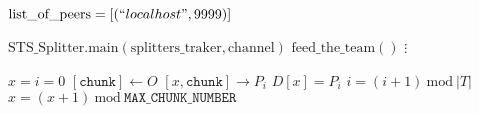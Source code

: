 \documentclass{article}
\begin{document}
\pagestyle{empty}

\newcommand{\send}{\Rightarrow}
\newcommand{\sendto}{\rightarrow}
\newcommand{\recv}{\Leftarrow}
\algrenewcommand\textproc{\textrm}

\begin{algorithmic}

  \algrenewcommand{}

  \State $\text{list\_of\_peers}=[(``localhost", 9999)]$
  
  \State $\text{STS\_Splitter}.\text{main}(\text{splitters\_traker},\text{channel})$
  \State $\text{feed\_the\_team}()$
  \State $\vdots$
  \EndFunction

  \algrenewcommand{}
  \State $x=i=0$
  \State $[\mathtt{chunk}] \gets O$
  \State $[x,\mathtt{chunk}] \sendto P_i$
  \State $D[x]=P_i$
  \State $i=(i+1)~\text{mod}~|T|$
  \State $x=(x+1)~\text{mod}~\mathtt{MAX\_CHUNK\_NUMBER}$
  \EndWhile
  \EndProcedure

  \EndProcedure
  
\end{algorithmic}
\end{document}
